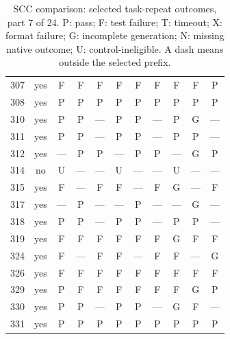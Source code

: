 \begin{table}[p]
\begin{tabular*}{\textwidth}{@{\extracolsep{\fill}}rc*{9}{c}@{}}
307 & yes & F & F & F & F & F & F & F & F & P\\
308 & yes & P & P & P & P & P & P & P & P & P\\
310 & yes & P & P & — & P & P & — & P & G & —\\
311 & yes & P & P & — & P & P & — & P & P & —\\
312 & yes & — & P & P & — & P & P & — & G & P\\
314 & no & U & — & — & U & — & — & U & — & —\\
315 & yes & F & — & F & F & — & F & G & — & F\\
317 & yes & — & P & — & — & P & — & — & G & —\\
318 & yes & P & P & — & P & P & — & P & P & —\\
319 & yes & F & F & F & F & F & F & G & F & F\\
324 & yes & F & — & F & F & — & F & F & — & G\\
326 & yes & F & F & F & F & F & F & F & F & F\\
329 & yes & P & F & F & F & F & F & F & G & P\\
330 & yes & P & P & — & P & P & — & G & F & —\\
331 & yes & P & P & P & P & P & P & P & P & P\\
\bottomrule\end{tabular*}
\caption{SCC comparison: selected task-repeat outcomes, part 7 of 24. P: pass; F: test failure; T: timeout; X: format failure; G: incomplete generation; N: missing native outcome; U: control-ineligible. A dash means outside the selected prefix.}
\end{table}
\clearpage
